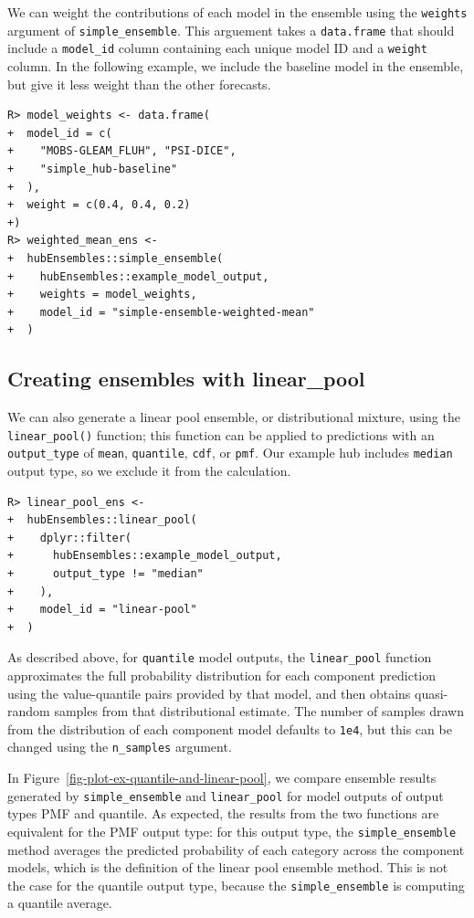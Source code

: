 \documentclass[
  article,
  shortnames,
  notitle]{jss}
\begin{document}
We can weight the contributions of each model in the ensemble using the
\texttt{weights} argument of \texttt{simple\_ensemble}. This arguement
takes a \texttt{data.frame} that should include a \texttt{model\_id}
column containing each unique model ID and a \texttt{weight} column. In
the following example, we include the baseline model in the ensemble,
but give it less weight than the other forecasts.

\begin{verbatim}
R> model_weights <- data.frame(
+  model_id = c(
+    "MOBS-GLEAM_FLUH", "PSI-DICE",
+    "simple_hub-baseline"
+  ),
+  weight = c(0.4, 0.4, 0.2)
+)
R> weighted_mean_ens <-
+  hubEnsembles::simple_ensemble(
+    hubEnsembles::example_model_output,
+    weights = model_weights,
+    model_id = "simple-ensemble-weighted-mean"
+  )
\end{verbatim}

\subsection{Creating ensembles with
linear\_pool}\label{creating-ensembles-with-linear_pool}

We can also generate a linear pool ensemble, or distributional mixture,
using the \texttt{linear\_pool()} function; this function can be applied
to predictions with an \texttt{output\_type} of \texttt{mean},
\texttt{quantile}, \texttt{cdf}, or \texttt{pmf}. Our example hub
includes \texttt{median} output type, so we exclude it from the
calculation.

\begin{verbatim}
R> linear_pool_ens <-
+  hubEnsembles::linear_pool(
+    dplyr::filter(
+      hubEnsembles::example_model_output,
+      output_type != "median"
+    ),
+    model_id = "linear-pool"
+  )
\end{verbatim}

As described above, for \texttt{quantile} model outputs, the
\texttt{linear\_pool} function approximates the full probability
distribution for each component prediction using the value-quantile
pairs provided by that model, and then obtains quasi-random samples from
that distributional estimate. The number of samples drawn from the
distribution of each component model defaults to \texttt{1e4}, but this
can be changed using the \texttt{n\_samples} argument.

In Figure~\ref{fig-plot-ex-quantile-and-linear-pool}, we compare
ensemble results generated by \texttt{simple\_ensemble} and
\texttt{linear\_pool} for model outputs of output types PMF and
quantile. As expected, the results from the two functions are equivalent
for the PMF output type: for this output type, the
\texttt{simple\_ensemble} method averages the predicted probability of
each category across the component models, which is the definition of
the linear pool ensemble method. This is not the case for the quantile
output type, because the \texttt{simple\_ensemble} is computing a
quantile average.
\end{document}
